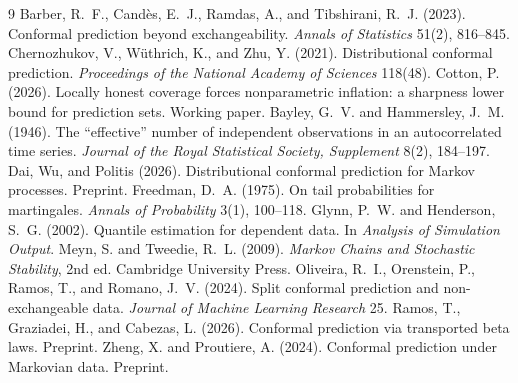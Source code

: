 \documentclass[11pt]{article}
\theoremstyle{definition}
\theoremstyle{remark}
\begin{document}

\begin{thebibliography}{9}
 Barber, R.~F., Cand\`es, E.~J., Ramdas, A.,
  and Tibshirani, R.~J. (2023). Conformal prediction beyond exchangeability. \emph{Annals of
  Statistics} 51(2), 816--845.
 Chernozhukov, V.,
  W\"uthrich, K., and Zhu, Y. (2021). Distributional conformal prediction. \emph{Proceedings
  of the National Academy of Sciences} 118(48).
 Cotton, P. (2026). Locally honest coverage forces
  nonparametric inflation: a sharpness lower bound for prediction sets. Working paper.
 Bayley, G.~V. and Hammersley, J.~M.
  (1946). The ``effective'' number of independent observations in an autocorrelated time series.
  \emph{Journal of the Royal Statistical Society, Supplement} 8(2), 184--197.
 Dai, Wu, and Politis (2026). Distributional
  conformal prediction for Markov processes. Preprint.
 Freedman, D.~A. (1975). On tail probabilities for
  martingales. \emph{Annals of Probability} 3(1), 100--118.
 Glynn, P.~W. and Henderson, S.~G.
  (2002). Quantile estimation for dependent data. In \emph{Analysis of Simulation Output}.
 Meyn, S. and Tweedie, R.~L. (2009).
  \emph{Markov Chains and Stochastic Stability}, 2nd ed. Cambridge University Press.
 Oliveira, R.~I., Orenstein, P., Ramos, T.,
  and Romano, J.~V. (2024). Split conformal prediction and non-exchangeable data. \emph{Journal
  of Machine Learning Research} 25.
 Ramos, T., Graziadei, H., and Cabezas, L.
  (2026). Conformal prediction via transported beta laws. Preprint.
 Zheng, X. and Proutiere, A. (2024).
  Conformal prediction under Markovian data. Preprint.
\end{thebibliography}
\end{document}
